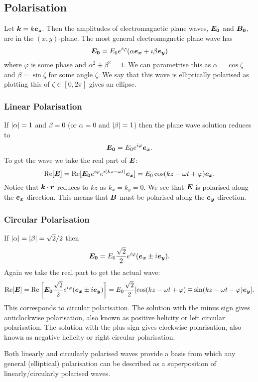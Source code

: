     \subsection{Polarisation}
    Let \(\bm{k} = k\bm{e_{z}}\).
    Then the amplitudes of electromagnetic plane waves, \(\bm{E_0}\) and \(\bm{B_0}\), are in the \((x, y)\)-plane.
    The most general electromagnetic plane wave has
    \[\bm{E_0} = E_0e^{i\varphi}(\alpha\bm{e_{x}} + i\beta\bm{e_{y}})\]
    where \(\varphi\) is some phase and \(\alpha^2 + \beta^2 = 1\).
    We can parametrise this as \(\alpha = \cos\zeta\) and \(\beta = \sin\zeta\) for some angle \(\zeta\).
    We say that this wave is elliptically polarised as plotting this of \(\zeta\in[0, 2\pi]\) gives an ellipse.
    
    \subsubsection{Linear Polarisation}
    If \(\abs{\alpha} = 1\) and \(\beta = 0\) (or \(\alpha = 0\) and \(\abs{\beta} = 1\)) then the plane wave solution reduces to
    \[\bm{E_0} = E_0e^{i\varphi}\bm{e_{x}}.\]
    To get the wave we take the real part of \(\bm{E}\):
    \[\Re[\bm{E}] = \Re[\bm{E_0}e^{i\varphi}e^{i(kz - \omega t)}\bm{e_{x}}] = E_0\cos(kz - \omega t + \varphi)\bm{e_{x}}.\]
    Notice that \(\bm{k}\cdot\bm{r}\) reduces to \(kz\) as \(k_x = k_y = 0\).
    We see that \(\bm{E}\) is polarised along the \(\bm{e_{x}}\) direction.
    This means that \(\bm{B}\) must be polarised along the \(\bm{e_{y}}\) direction.
    
    \subsubsection{Circular Polarisation}
    If \(\abs{\alpha} = \abs{\beta} = \sqrt{2}/2\) then
    \[\bm{E_0} = E_0\frac{\sqrt{2}}{2}e^{i\varphi}(\bm{e_{x}} \pm i\bm{e_{y}}).\]
    Again we take the real part to get the actual wave:
    \[\Re[\bm{E}] = \Re\left[\bm{E_0}\frac{\sqrt{2}}{2}e^{i\varphi} (\bm{e_{x}} \pm i\bm{e_{y}})\right] = E_0\frac{\sqrt{2}}{2}[\cos(kz - \omega t + \varphi) \mp \sin(kz - \omega t - \varphi)\bm{e_{y}}].\]
    This corresponds to circular polarisation.
    The solution with the minus sign gives anticlockwise polarisation, also known as positive helicity or left circular polarisation.
    The solution with the plus sign gives clockwise polarisation, also known as negative helicity or right circular polarisation.
    
    Both linearly and circularly polarised waves provide a basis from which any general (elliptical) polarisation can be described as a superposition of linearly/circularly polarised waves.
    
